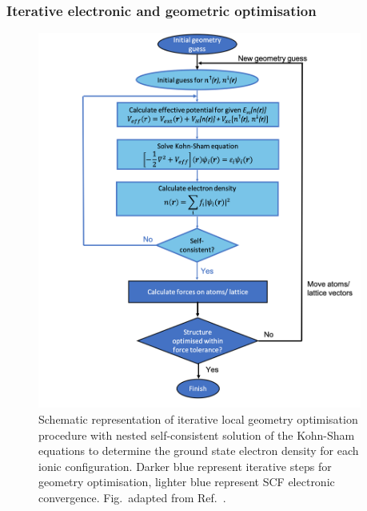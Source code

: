 \documentclass[11pt, twoside]{report}
\begin{document}
\subsubsection{Iterative electronic and geometric optimisation}
\begin{figure}[h!]
  \centering
    \includegraphics[width=0.95\textwidth]{figures/scf_flowchart.png}
    \caption[Schematic representation of iterative local geometry optimisation procedure with nested self-consistent solution of the Kohn-Sham equations to determine the ground state electron density for each ionic configuration. Darker blue represent iterative steps for geometry optimisation, lighter blue represent SCF electronic convergence.]{Schematic representation of iterative local geometry optimisation procedure with nested self-consistent solution of the Kohn-Sham equations to determine the ground state electron density for each ionic configuration. Darker blue represent iterative steps for geometry optimisation, lighter blue represent SCF electronic convergence. Fig.~adapted from Ref.~.}
    \label{SCF_flowchart}
\end{figure}
\end{document}
